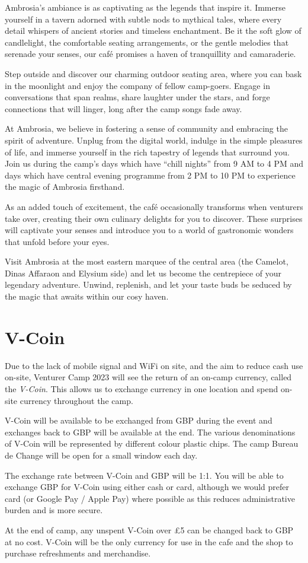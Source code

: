 \documentclass[a4paper, 11pt]{report}
\begin{document}
Ambrosia's ambiance is as captivating as the legends that inspire it. Immerse yourself in a tavern adorned with subtle nods to mythical tales, where every detail whispers of ancient stories and timeless enchantment. Be it the soft glow of candlelight, the comfortable seating arrangements, or the gentle melodies that serenade your senses, our café promises a haven of tranquillity and camaraderie.\nl

Step outside and discover our charming outdoor seating area, where you can bask in the moonlight and enjoy the company of fellow camp-goers. Engage in conversations that span realms, share laughter under the stars, and forge connections that will linger, long after the camp songs fade away.\nl

At Ambrosia, we believe in fostering a sense of community and embracing the spirit of adventure. Unplug from the digital world, indulge in the simple pleasures of life, and immerse yourself in the rich tapestry of legends that surround you. Join us during the camp's days which have “chill nights” from 9 AM to 4 PM and days which have central evening programme from 2 PM to 10 PM to experience the magic of Ambrosia firsthand.\nl

As an added touch of excitement, the café occasionally transforms when venturers take over, creating their own culinary delights for you to discover. These surprises will captivate your senses and introduce you to a world of gastronomic wonders that unfold before your eyes.\nl

Visit Ambrosia at the most eastern marquee of the central area (the Camelot, Dinas Affaraon and Elysium side) and let us become the centrepiece of your legendary adventure. Unwind, replenish, and let your taste buds be seduced by the magic that awaits within our cosy haven.

\chapter{V-Coin}
Due to the lack of mobile signal and WiFi on site, and the aim to reduce cash use on-site, Venturer Camp 2023 will see the return of an on-camp currency, called the \textit{V-Coin}. This allows us to exchange currency in one location and spend on-site currency throughout the camp.\nl

V-Coin will be available to be exchanged from GBP during the event and exchanges back to GBP will be available at the end. The various denominations of V-Coin will be represented by different colour plastic chips. The camp Bureau de Change will be open for a small window each day. \nl

The exchange rate between V-Coin and GBP will be 1:1. You will be able to exchange GBP for V-Coin using either cash or card, although we would prefer card (or Google Pay / Apple Pay) where possible as this reduces administrative burden and is more secure.\nl

At the end of camp, any unspent V-Coin over £5 can be changed back to GBP at no cost. V-Coin will be the only currency for use in the cafe and the shop to purchase refreshments and merchandise. \nl


\backPage
\end{document}
